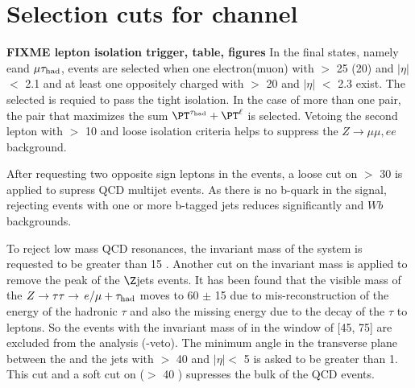 \section{\texorpdfstring{Selection cuts for \leptonTau channel}{Selection cuts for lepton-tau channel}}
\label{sect:eleTauCuts}
{\bf FIXME lepton isolation trigger, table, figures}
In the \leptonTau final states, namely e\Tau and $\mu\tau_{\rm had}$, 
events are selected when one electron(muon) with \PT $>$ 25 (20) \GeV and $|\eta|$ $<$ 2.1 and at least 
one oppositely charged \Tau with \PT $>$ 20 \GeV and $|\eta|$ $<$ 2.3 exist. %
The selected \Tau is requied to pass the tight isolation.
In the case of more than one pair, the pair that maximizes the sum $\PT^{\Tau} + \PT^{\ell}$ is selected.
Vetoing the second lepton with \PT $>$ 10 \GeV and loose isolation criteria helps to suppress the $Z\rightarrow \mu\mu, ee$ background.

After requesting two opposite sign leptons in the events, a loose cut on \MET $>$ 30 \GeV is applied to supress QCD multijet events. 
As there is no b-quark in the signal, rejecting events with one or more b-tagged jets reduces significantly \ttbar and $Wb$ backgrounds.

To reject low mass QCD resonances, the invariant mass of the \leptonTau system  is requested to be greater than 15 \GeV. 
Another cut on the invariant mass is applied to remove the peak of the $\Z$jets events. 
It has been found that the visible mass of the $Z\to\tau\tau\to\,e/\mu +\tau_{\rm had}$ moves to 60 $\pm$ 15 \GeV due to 
mis-reconstruction of the energy of the hadronic $\tau$ and also the missing energy due to the decay of the $\tau$ to leptons. 
So the events with the invariant mass of \leptonTau in the window of [45, 75] are excluded from the analysis (\Z-veto). 
The minimum angle in the transverse plane between the \MET and the jets with \PT $>$ 40 \GeV and $|\eta| <$ 5 
is asked to be greater than 1. This cut and a soft cut on \mttwo ($>$ 40 \GeV) supresses the bulk of the QCD events.

